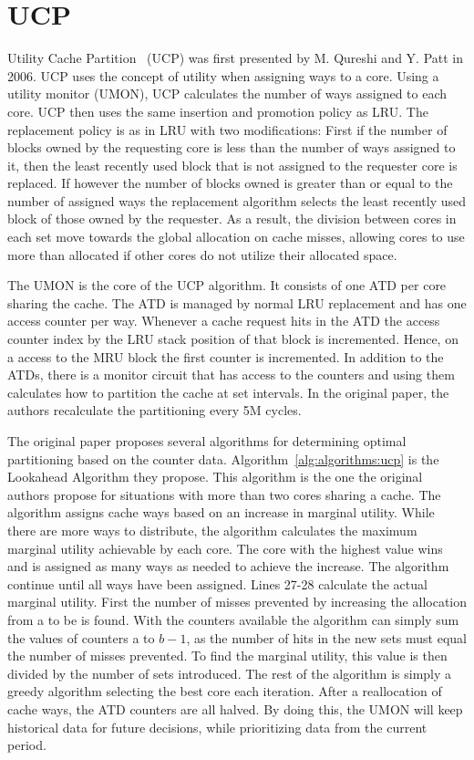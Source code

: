 \section{UCP}
\label{sec:algorithms:ucp}

Utility Cache Partition~\cite{Qureshi2006} (UCP) was first presented by M. Qureshi and Y. Patt in 2006. 
UCP uses the concept of utility when assigning ways to a core.
Using a utility monitor (UMON), UCP calculates the number of ways assigned to each core.
UCP then uses the same insertion and promotion policy as LRU.
The replacement policy is as in LRU with two modifications:
First if the number of blocks owned by the requesting core is less than the number of ways assigned to it, then the least recently used block that is not assigned to the requester core is replaced.
If however the number of blocks owned is greater than or equal to the number of assigned ways the replacement algorithm selects the  least recently used block of those owned by the requester.
As a result, the division between cores in each set move towards the global allocation on cache misses, allowing cores to use more than allocated if other cores do not utilize their allocated space.

The UMON is the core of the UCP algorithm.
It consists of one ATD per core sharing the cache. 
The ATD is managed by normal LRU replacement and has one access counter per way.
Whenever a cache request hits in the ATD the access counter index by the LRU stack position of that block is incremented.
Hence, on a access to the MRU block the first counter is incremented.
In addition to the ATDs, there is a monitor circuit that has access to the counters and using them calculates how to partition the cache at set intervals. 
In the original paper, the authors recalculate the partitioning every 5M cycles.

The original paper proposes several algorithms for determining optimal partitioning based on the counter data. 
Algorithm~\ref{alg:algorithms:ucp} is the Lookahead Algorithm they propose.
This algorithm is the one the original authors propose for situations with more than two cores sharing a cache.
The algorithm assigns cache ways based on an increase in marginal utility.
While there are more ways to distribute, the algorithm calculates the maximum marginal utility achievable by each core. 
The core with the highest value wins and is assigned as many ways as needed to achieve the increase.
The algorithm continue until all ways have been assigned.
Lines 27-28 calculate the actual marginal utility. 
First the number of misses prevented by increasing the allocation from a to be is found.
With the counters available the algorithm can simply sum the values of counters a to $b-1$, as the number of hits in the new sets must equal the number of misses prevented.
To find the marginal utility, this value is then divided by the number of sets introduced.
The rest of the algorithm is simply a greedy algorithm selecting the best core each iteration.
After a reallocation of cache ways, the ATD counters are all halved.
By doing this, the UMON will keep historical data for future decisions, while prioritizing data from the current period.

